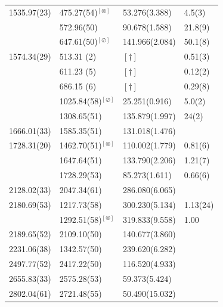 \begin{longtable}{l|l|l|l}
 1535.97(23) &  475.27(54)$^{[\otimes]}$& 53.276(3.388)  & 4.5(3) \cite{Aprahamian200642}\\ %
             &  572.96(50)               & 90.678(1.588)  & 21.8(9) \cite{Aprahamian200642}\\  %
             &  647.61(50)$^{[\oslash]}$ &141.966(2.084)  & 50.1(8) \cite{Aprahamian200642}\\ \hline %
1574.34(29)  & 513.31 (2)                &  $[\dagger]$   & 0.51(3) \cite{Aprahamian200642}\\
             & 611.23 (5)                &  $[\dagger]$   & 0.12(2) \cite{Aprahamian200642}\\
             & 686.15 (6)                &  $[\dagger]$   & 0.29(8) \cite{Aprahamian200642}\\
             & 1025.84(58)$^{[\oslash]}$ &  25.251(0.916) & 5.0(2) \cite{Aprahamian200642}\\    %
             & 1308.65(51)               & 135.879(1.997) & 24(2)  \cite{Aprahamian200642}\\  \hline %
1666.01(33)  & 1585.35(51)               & 131.018(1.476) & \\  \hline %
1728.31(20)  & 1462.70(51)$^{[\otimes]}$& 110.002(1.779) & 0.81(6) \cite{Govor_162Dy2002} \\   %
             & 1647.64(51)               & 133.790(2.206) & 1.21(7) \cite{Govor_162Dy2002} \\   %
             & 1728.29(53)               &  85.273(1.611) & 0.66(6) \cite{Govor_162Dy2002} \\  \hline %
2128.02(33)  & 2047.34(61)               & 286.080(6.065) & \\ \hline  %
 2180.69(53) &  1217.73(58)              &300.230(5.134)  & 1.13(24) \cite{Wu_2minus_2001}\\  %
             &  1292.51(58)$^{[\otimes]}$&319.833(9.558) & 1.00     \cite{Wu_2minus_2001} \\ \hline %
2189.65(52)  & 2109.10(50)               & 140.677(3.860) & \\ \hline  %
 2231.06(38) & 1342.57(50)               &239.620(6.282)  & \\  \hline%
2497.77(52)  & 2417.22(50)               & 116.520(4.933) & \\ \hline  %
2655.83(33)  & 2575.28(53)               &  59.373(5.424) & \\  \hline %
2802.04(61)  & 2721.48(55)               &  50.490(15.032)& \\ \hline  %




\end{longtable}
